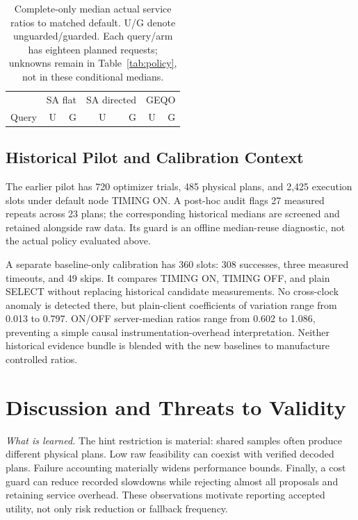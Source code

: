 \documentclass[conference]{IEEEtran}
\begin{document}
\begin{table}[t]
\caption{Complete-only median actual service ratios to matched default.
U/G denote unguarded/guarded. Each query/arm has eighteen planned requests;
unknowns remain in Table~\ref{tab:policy}, not in these conditional medians.}
\label{tab:policyquery}
\centering\scriptsize\setlength{\tabcolsep}{3.4pt}
\begin{tabular}{@{}lrrrrrr@{}}\toprule
& \multicolumn{2}{c}{SA flat} & \multicolumn{2}{c}{SA directed} & \multicolumn{2}{c}{GEQO}\\
Query & U & G & U & G & U & G\\\midrule

\end{tabular}
\end{table}

\subsection{Historical Pilot and Calibration Context}
The earlier pilot has 720 optimizer trials, 485 physical plans, and 2,425
execution slots under default node TIMING ON. A post-hoc audit flags 27 measured
repeats across 23 plans; the corresponding historical medians are screened and
retained alongside raw data. Its guard is an offline median-reuse diagnostic,
not the actual policy evaluated above.

A separate baseline-only calibration has 360 slots: 308 successes, three
measured timeouts, and 49 skips. It compares TIMING ON, TIMING OFF, and plain
SELECT without replacing historical candidate measurements. No cross-clock
anomaly is detected there, but plain-client coefficients of variation range
from 0.013 to 0.797. ON/OFF server-median ratios range from 0.602 to 1.086,
preventing a simple causal instrumentation-overhead interpretation. Neither
historical evidence bundle is blended with the new baselines to manufacture
controlled ratios.

\section{Discussion and Threats to Validity}
\emph{What is learned.} The hint restriction is material: shared samples often
produce different physical plans. Low raw feasibility can coexist with verified
decoded plans. Failure accounting materially widens performance bounds. Finally,
a cost guard can reduce recorded slowdowns while rejecting almost all proposals
and retaining service overhead. These observations motivate reporting accepted
utility, not only risk reduction or fallback frequency.
\end{document}
